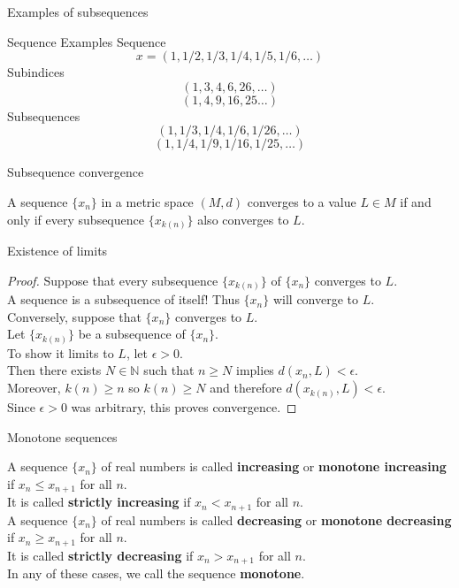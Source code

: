 \documentclass{beamer}
\begin{document}
\begin{frame}{Examples of subsequences}
\begin{block}{Sequence Examples}
\pause
Sequence
$$x = (1, 1/2, 1/3, 1/4, 1/5, 1/6,\dots)$$
\pause
Subindices
$$(1,3,4,6,26,\dots)$$
$$(1,4,9,16,25\dots)$$
\pause
Subsequences
$$(1,1/3,1/4,1/6,1/26,\dots)$$
$$(1,1/4,1/9,1/16,1/25,\dots)$$
\end{block}
\end{frame}

\begin{frame}{Subsequence convergence}
\pause
\begin{thm}
A sequence $\{x_n\}$ in a metric space $(M,d)$ converges to a value $L\in M$ if and only if every subsequence $\{x_{k(n)}\}$ also converges to $L$.
\end{thm}
\end{frame}

\begin{frame}{Existence of limits}
\begin{proof}
Suppose that every subsequence $\{x_{k(n)}\}$ of $\{x_n\}$ converges to $L$.\\
\pause
A sequence is a subsequence of itself!  Thus $\{x_n\}$ will converge to $L$.\\
\pause
Conversely, suppose that $\{x_n\}$ converges to $L$.\\
\pause
Let $\{x_{k(n)}\}$ be a subsequence of $\{x_n\}$.\\
\pause
To show it limits to $L$, let $\epsilon > 0$.\\
\pause
Then there exists $N\in\mathbb N$ such that $n\geq N$ implies $d(x_n,L)<\epsilon$.\\
\pause
Moreover, $k(n)\geq n$ so $k(n)\geq N$ and therefore $d(x_{k(n)}, L) < \epsilon$.\\
\pause
Since $\epsilon > 0$ was arbitrary, this proves convergence.
\end{proof}
\end{frame}

\begin{frame}{Monotone sequences}
\begin{defn}
\pause
A sequence $\{x_n\}$ of real numbers is called \textbf{increasing} or \textbf{monotone increasing} if $x_n\leq x_{n+1}$ for all $n$.\\
\pause
It is called \textbf{strictly increasing} if $x_n < x_{n+1}$ for all $n$.\\
\pause
A sequence $\{x_n\}$ of real numbers is called \textbf{decreasing} or \textbf{monotone decreasing} if $x_n\geq x_{n+1}$ for all $n$.\\
\pause
It is called \textbf{strictly decreasing} if $x_n > x_{n+1}$ for all $n$.\\
\pause
In any of these cases, we call the sequence \textbf{monotone}.
\end{defn}
\end{frame}
\end{document}
